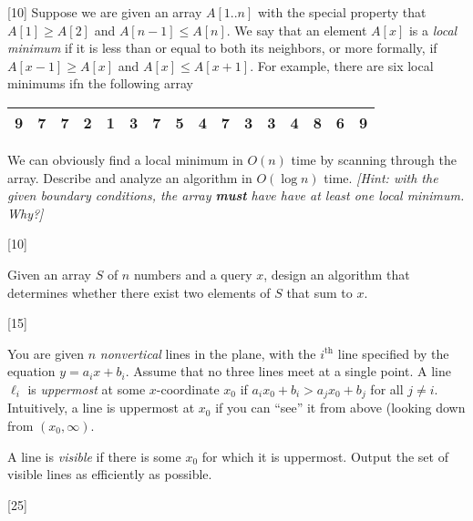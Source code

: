 \documentclass[addpoints]{exam}
\begin{document}
\begin{questions}
[10]
Suppose we are given an array $A[1..n]$ with the special property that $A[1]\geq A[2]$ and $A[n-1]\leq A[n]$. We say that an element $A[x]$ is a \textit{local minimum} if it is less than or equal to both its neighbors, or more formally, if $A[x-1]\geq A[x]$ and $A[x]\leq A[x+1]$. For example, there are six local minimums ifn the following array
\begin{center}
\begin{tabular}{|c|c|c|c|c|c|c|c|c|c|c|c|c|c|c|c|}
\hline
9 & \textbf{7} & 7 & 2 & \textbf{1} & 3 & 7 & 5 & \textbf{4} & 7 & \textbf{3} & \textbf{3} & 4 & 8 & \textbf{6} & 9\\
\hline
\end{tabular} 
\end{center}
 We can obviously find a local minimum in $O(n)$ time by scanning through the array. Describe and analyze an algorithm in $O(\log n)$ time. \textit{[Hint: with the given boundary conditions, the array \textbf{must} have have at least one local minimum. Why?]}

[10]

Given an array $S$ of $n$ numbers and a query $x$, design an algorithm that determines whether there exist two elements of $S$ that sum to $x$. 

[15]

You are given $n$ \emph{nonvertical} lines in the plane, with the $i^{\text{th}}$ line specified by the equation $y = a_i x + b_i$. Assume that no three lines meet at a single point. A line $\ell_i$ is \emph{uppermost} at some $x$-coordinate $x_0$ if $a_i x_0 + b_i > a_j x_0 + b_j$ for all $j \ne i$. Intuitively, a line is uppermost at $x_0$ if you can ``see'' it from above (looking down from $(x_0,\infty)$. 

A line is \emph{visible} if there is some $x_0$ for which it is uppermost. Output the set of visible lines as efficiently as possible. 


[25]
\end{questions}
\end{document}
